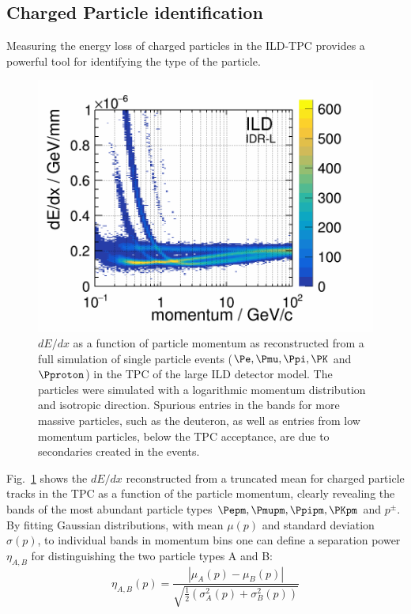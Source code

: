 \subsection{Charged Particle identification}
\label{sec:perf:sys:pid}
%
%
Measuring the energy loss of charged particles in the ILD-TPC provides a powerful tool for identifying the type of the particle.
\begin{figure}[htbp]
\includegraphics[width=0.8\hsize]{Performance/fig/dEdx_BBAll_lowGran_bigCap.png}
\caption{\label{fig:perf:dedx_tpc}
  $dE/dx$ as a function of particle momentum as reconstructed from a full simulation of single particle events ($\Pe, \Pmu, \Ppi, \PK$ and $\Pproton$)
  in the TPC of the large ILD detector model. The particles were simulated with a logarithmic momentum distribution and isotropic direction. Spurious
  entries in the bands for more massive particles, such as the deuteron, as well as entries from low momentum particles, below the TPC acceptance,
  are due to secondaries created in the events.
}
\end{figure}
%
Fig.~\ref{fig:perf:dedx_tpc} shows the $dE/dx$ reconstructed from a truncated mean for charged particle tracks in the TPC as a function of
the particle momentum, clearly revealing the bands of the most abundant particle types $\Pepm, \Pmupm, \Ppipm, \PKpm$ and $p^{\pm}$.
By fitting Gaussian distributions, with mean $\mu(p)$ and standard deviation $\sigma(p)$, to individual bands in momentum bins one can
define a separation power $\eta_{A,B}$ for distinguishing the two particle types A and B:
\begin{equation}
\eta_{A,B}(p) = \frac{ |\mu_A(p) - \mu_B(p)| } { \sqrt{ \frac{1}{2} ( \sigma^2_A(p) + \sigma^2_B(p) )  }  }
\label{ild:eq:seppow}
\end{equation}

